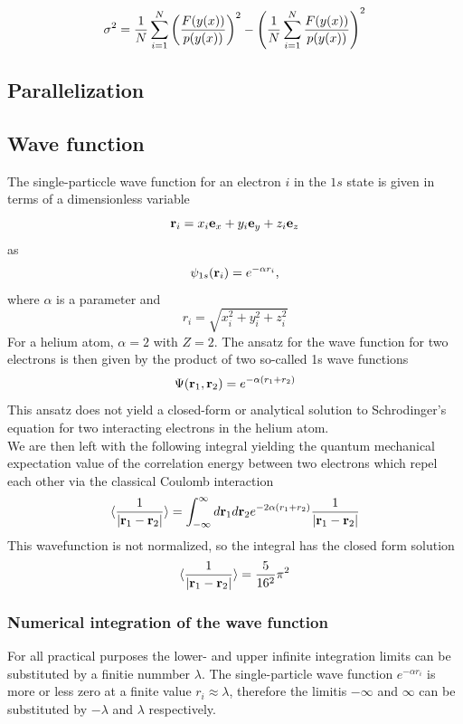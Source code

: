 \documentclass[%
reprint,
amsmath,amssymb,
aps,
]{revtex4-1}
\begin{document}
\begin{equation}
	\sigma^2 = \dfrac{1}{N}\sum_{i = 1}^{N}\qty(\dfrac{F(y(x))}{p(y(x))})^2 -\qty(\dfrac{1}{N}\sum_{i = 1}^{N}\dfrac{F(y(x))}{p(y(x))})^2
\end{equation}
\subsection{Parallelization}

\subsection{Wave function} \noindent 
The single-particcle wave function for an electron $i$ in the $1s$ state is given in terms of a dimensionless variable 
\begin{equation*}
	 {\bf r}_i =  x_i {\bf e}_x + y_i {\bf e}_y +z_i {\bf e}_z 
\end{equation*}
as 
\begin{equation*}
	\psi_{1s}({\bf r}_i)  =   e^{-\alpha r_i},
\end{equation*}
where $\alpha$ is a parameter and 
\begin{equation*}
	r_i = \sqrt{x_i^2+y_i^2+z_i^2}
\end{equation*}
For a helium atom, $\alpha = 2$ with $Z = 2$. The ansatz for the wave function for two electrons is then given by the product of two so-called 1s wave functions
\begin{equation}\label{waveequation}
	\Psi({\bf r}_1,{\bf r}_2)  =   e^{-\alpha (r_1+r_2)}
\end{equation}
This ansatz does not yield a closed-form or analytical solution to Schrodinger's equation for two interacting electrons in the helium atom. \\
We are then left with the following integral yielding the quantum mechanical expectation value of the correlation energy between two electrons which repel each other via the classical Coulomb interaction
\begin{equation}
	   \langle \frac{1}{|{\bf r}_1-{\bf r}_2|} \rangle =
	\int_{-\infty}^{\infty} d{\bf r}_1d{\bf r}_2  e^{-2\alpha (r_1+r_2)}\frac{1}{|{\bf r}_1-{\bf r}_2|}
\end{equation}
This wavefunction is not normalized, so the integral has the closed form solution 
\begin{equation}
\langle \frac{1}{|{\bf r}_1-{\bf r}_2|} \rangle = \dfrac{5}{16^2}\pi^2
\end{equation}
\subsubsection*{Numerical integration of the wave function}
For all practical purposes the lower- and upper infinite integration limits can be substituted by a finitie nummber $\lambda$. The single-particle wave function $e^{-\alpha r_i}$ is more or less zero at a finite value $r_i\approx \lambda$, therefore the limitis $-\infty$ and $\infty$ can be substituted by $-\lambda$ and $\lambda$ respectively. 
\vspace{10mm}
\end{document}

